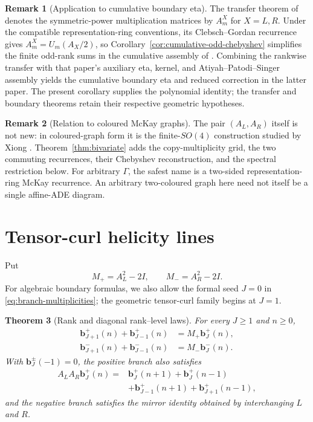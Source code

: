 \documentclass[11pt]{article}
\newtheorem{theorem}{Theorem}[section]
\theoremstyle{definition}
\newtheorem{remark}[theorem]{Remark}
\begin{document}
\begin{remark}[Application to cumulative boundary eta]
\label{rem:p3-cumulative-interface}
The transfer theorem of
\cite{Mahmood2026DiracToTensorCurlEtaTransfer} denotes the symmetric-power
multiplication matrices by $A_m^X$ for $X=L,R$.  Under the compatible
representation-ring conventions, its Clebsch--Gordan recurrence gives
$A_m^X=U_m(A_X/2)$, so Corollary~\ref{cor:cumulative-odd-chebyshev}
simplifies the finite odd-rank sums in the cumulative assembly of
\cite{Mahmood2026SteinWeissAPSBoundary}.  Combining the rankwise
transfer with that paper's auxiliary eta, kernel, and
Atiyah--Patodi--Singer assembly yields the cumulative boundary
eta and reduced correction in the latter paper.  The present corollary
supplies the polynomial identity; the transfer and boundary theorems retain
their respective geometric hypotheses.
\end{remark}

\begin{remark}[Relation to coloured McKay graphs]
The pair $(A_L,A_R)$ itself is not new: in coloured-graph form it is
the finite-$SO(4)$ construction studied by Xiong \cite{Xiong2020}.
Theorem~\ref{thm:bivariate} adds the copy-multiplicity grid, the two
commuting recurrences, their Chebyshev reconstruction, and the spectral
restriction below.  For arbitrary $\Gamma$, the safest name is a
two-sided representation-ring McKay recurrence.  An arbitrary
two-coloured graph here need not itself be a single affine-ADE diagram.
\end{remark}

\section{Tensor-curl helicity lines}

Put
\begin{equation}
 M_+=A_L^2-2I,
 \qquad
 M_-=A_R^2-2I.
 \label{eq:rank-matrices}
\end{equation}
For algebraic boundary formulas, we also allow the formal seed $J=0$ in
\eqref{eq:branch-multiplicities}; the geometric tensor-curl family
begins at $J=1$.

\begin{theorem}[Rank and diagonal rank--level laws]
\label{thm:tt-lines}
For every $J\geq1$ and $n\geq0$,
\begin{align}
 \boldsymbol b_{J+1}^{+}(n)+\boldsymbol b_{J-1}^{+}(n)
 &=M_+\boldsymbol b_J^{+}(n),
 \label{eq:plus-rank}\\
 \boldsymbol b_{J+1}^{-}(n)+\boldsymbol b_{J-1}^{-}(n)
 &=M_-\boldsymbol b_J^{-}(n).
 \label{eq:minus-rank}
\end{align}
With $\boldsymbol b_J^\pm(-1)=0$, the positive branch also satisfies
\begin{align}
 A_LA_R\boldsymbol b_J^+(n)
 ={}&\boldsymbol b_J^+(n+1)+\boldsymbol b_J^+(n-1)
 \nonumber\\
 &+\boldsymbol b_{J-1}^+(n+1)
 +\boldsymbol b_{J+1}^+(n-1),
 \label{eq:diagonal-plus}
\end{align}
and the negative branch satisfies the mirror identity obtained by
interchanging $L$ and $R$.
\end{theorem}
\end{document}
